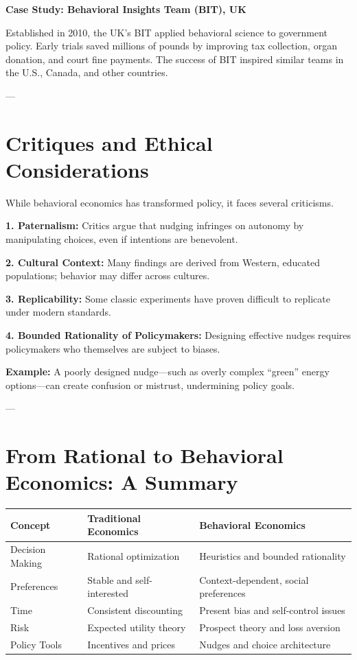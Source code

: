 \documentclass[11pt]{book}
\begin{document}
\begin{casebox}
\textbf{Case Study: Behavioral Insights Team (BIT), UK}  

Established in 2010, the UK’s BIT applied behavioral science to government policy.  
Early trials saved millions of pounds by improving tax collection, organ donation, and court fine payments.  
The success of BIT inspired similar teams in the U.S., Canada, and other countries.
\end{casebox}

---

\section*{Critiques and Ethical Considerations}

While behavioral economics has transformed policy, it faces several criticisms.

\textbf{1. Paternalism:}  
Critics argue that nudging infringes on autonomy by manipulating choices, even if intentions are benevolent.

\textbf{2. Cultural Context:}  
Many findings are derived from Western, educated populations; behavior may differ across cultures.

\textbf{3. Replicability:}  
Some classic experiments have proven difficult to replicate under modern standards.

\textbf{4. Bounded Rationality of Policymakers:}  
Designing effective nudges requires policymakers who themselves are subject to biases.

\begin{examplebox}
\textbf{Example:}  
A poorly designed nudge—such as overly complex ``green'' energy options—can create confusion or mistrust, undermining policy goals.
\end{examplebox}

---

\section*{From Rational to Behavioral Economics: A Summary}

\begin{center}
\begin{tabular}{p{4cm}p{5cm}p{6cm}}
\hline
\textbf{Concept} & \textbf{Traditional Economics} & \textbf{Behavioral Economics} \\
\hline
Decision Making & Rational optimization & Heuristics and bounded rationality \\
Preferences & Stable and self-interested & Context-dependent, social preferences \\
Time & Consistent discounting & Present bias and self-control issues \\
Risk & Expected utility theory & Prospect theory and loss aversion \\
Policy Tools & Incentives and prices & Nudges and choice architecture \\
\hline
\end{tabular}
\end{center}
\end{document}

